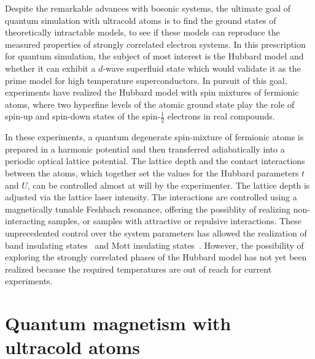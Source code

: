 \documentclass[oneside,11pt]{memoir}
\begin{document}
Despite the remarkable advances with bosonic systems, the ultimate goal of
quantum simulation with ultracold atoms is to find the ground states of
theoretically intractable models, to see if these models can reproduce the
measured properties of strongly correlated electron systems.  In this
prescription for quantum simulation, the subject of most interest is the
Hubbard model and whether it can exhibit a $d$-wave superfluid state which
would validate it as the prime model for high temperature superconductors.  In
pursuit of this goal, experiments have realized the Hubbard model with spin
mixtures of fermionic atoms, where two hyperfine levels of the atomic ground
state play the role of spin-up and spin-down states of the spin-$\frac{1}{2}$
electrons in real compounds. 

In these experiments, a quantum degenerate spin-mixture of fermionic atoms is
prepared in a harmonic potential and then transferred adiabatically into a
periodic optical lattice potential.  The lattice depth and the contact
interactions between the atoms, which together set the values for the Hubbard
parameters $t$ and $U$, can be controlled almost at will by the experimenter.
The lattice depth is adjusted via the lattice laser intensity.  The
interactions are controlled using a magnetically tunable Feshbach resonance,
offering the possiblity of realizing non-interacting samples, or samples with
attractive or repulsive interactions.  These unprecedented control over the
system parameters has allowed the realization of band insulating
states~\cite{Kohl2005} and Mott insulating
states~\cite{Jordens2008,Schneider2008}.  However, the possibility of exploring
the strongly correlated phases of the Hubbard model has not yet been realized
because the required temperatures are out of reach for current experiments.    


 
\section{Quantum magnetism with ultracold atoms }
\end{document}
